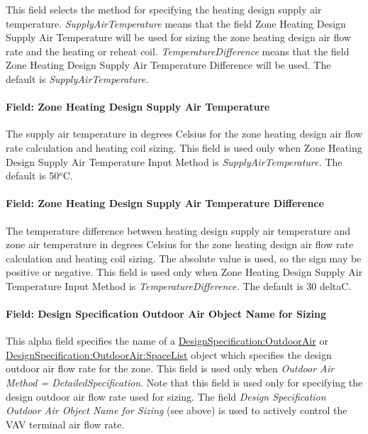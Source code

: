 This field selects the method for specifying the heating design supply air temperature. \emph{SupplyAirTemperature} means that the field Zone Heating Design Supply Air Temperature will be used for sizing the zone heating design air flow rate and the heating or reheat coil. \emph{TemperatureDifference} means that the field Zone Heating Design Supply Air Temperature Difference will be used. The default is \emph{SupplyAirTemperature.}

\paragraph{Field: Zone Heating Design Supply Air Temperature}\label{field-zone-heating-design-supply-air-temperature-5}

The supply air temperature in degrees Celsius for the zone heating design air flow rate calculation and heating coil sizing. This field is used only when Zone Heating Design Supply Air Temperature Input Method is \emph{SupplyAirTemperature.} The default is 50\(^{o}\)C.

\paragraph{Field: Zone Heating Design Supply Air Temperature Difference}\label{field-zone-heating-design-supply-air-temperature-difference-6}

The temperature difference between heating design supply air temperature and zone air temperature in degrees Celsius for the zone heating design air flow rate calculation and heating coil sizing. The absolute value is used, so the sign may be positive or negative. This field is used only when Zone Heating Design Supply Air Temperature Input Method is \emph{TemperatureDifference.} The default is 30 deltaC.

\paragraph{Field: Design Specification Outdoor Air Object Name for Sizing}\label{field-design-specification-outdoor-air-object-name-for-sizing}

This alpha field specifies the name of a \hyperref[designspecificationoutdoorair]{DesignSpecification:OutdoorAir} or \hyperref[designspecificationoutdoorairspacelist]{DesignSpecification:OutdoorAir:SpaceList} object which specifies the design outdoor air flow rate for the zone. This field is used only when \emph{Outdoor Air Method = DetailedSpecification}. Note that this field is used only for specifying the design outdoor air flow rate used for sizing. The field \emph{Design Specification Outdoor Air Object Name for Sizing} (see above) is used to actively control the VAV terminal air flow rate.

